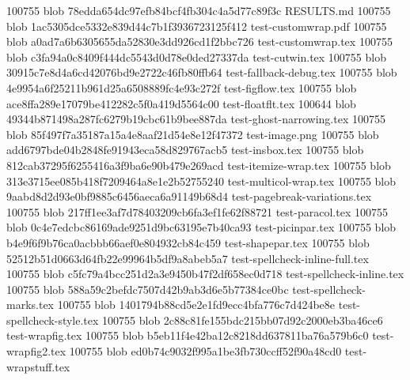 100755 blob 78edda654dc97efb84bcf4fb304c4a5d77c89f3c	RESULTS.md
100755 blob 1ac5305dce5332e839d44c7b1f3936723125f412	test-customwrap.pdf
100755 blob a0ad7a6b6305655da52830e3dd926cd1f2bbc726	test-customwrap.tex
100755 blob c3fa94a0c8409f444dc5543d0d78e0ded27337da	test-cutwin.tex
100755 blob 30915c7e8d4a6cd42076bd9e2722c46fb80ffb64	test-fallback-debug.tex
100755 blob 4e9954a6f25211b961d25a6508889fc4e93c272f	test-figflow.tex
100755 blob ace8ffa289e17079be412282c5f0a419d5564c00	test-floatflt.tex
100644 blob 49344b871498a287fc6279b19cbc61b9bee887da	test-ghost-narrowing.tex
100755 blob 85f497f7a35187a15a4e8aaf21d54e8e12f47372	test-image.png
100755 blob add6797bde04b2848fe91943eca58d829767acb5	test-insbox.tex
100755 blob 812cab37295f6255416a3f9ba6e90b479e269acd	test-itemize-wrap.tex
100755 blob 313e3715ee085b418f7209464a8e1e2b52755240	test-multicol-wrap.tex
100755 blob 9aabd8d2d93e0bf9885c6456aeca6a91149b68d4	test-pagebreak-variations.tex
100755 blob 217ff1ee3af7d78403209cb6fa3ef1fe62f88721	test-paracol.tex
100755 blob 0c4e7edcbc86169ade9251d9bc63195e7b40ca93	test-picinpar.tex
100755 blob b4e9f6f9b76ca0acbbb66aef0e804932cb84c459	test-shapepar.tex
100755 blob 52512b51d0663d64fb22e99964b5df9a8abeb5a7	test-spellcheck-inline-full.tex
100755 blob c5fc79a4bcc251d2a3e9450b47f2df658ec0d718	test-spellcheck-inline.tex
100755 blob 588a59c2befdc7507d42b9ab3d6e5b77384ce0bc	test-spellcheck-marks.tex
100755 blob 1401794b88cd5e2e1fd9ecc4bfa776c7d424be8e	test-spellcheck-style.tex
100755 blob 2c88c81fe155bdc215bb07d92c2000eb3ba46ce6	test-wrapfig.tex
100755 blob b5eb11f4e42ba12c8218dd637811ba76a579b6c0	test-wrapfig2.tex
100755 blob ed0b74c9032f995a1be3fb730ccff52f90a48cd0	test-wrapstuff.tex
